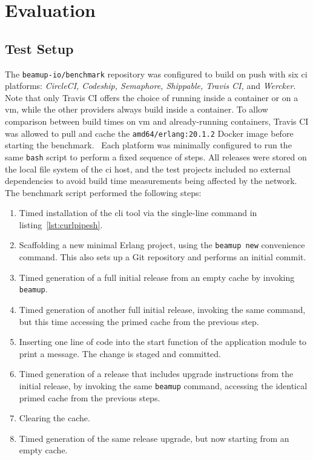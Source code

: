 \cleardoublepage
\section{Evaluation}


\subsection{Test Setup}
The \lstinline|beamup-io/benchmark| repository was configured to build on push with six \acrshort{ci} platforms: \emph{CircleCI, Codeship, Semaphore, Shippable, Travis CI,} and \emph{Wercker}. Note that only Travis CI offers the choice of running inside a container or on a \acrshort{vm}, while the other providers always build inside a container. To allow comparison between build times on \acrshort{vm} and already-running containers, Travis CI was allowed to pull and cache the \lstinline|amd64/erlang:20.1.2| Docker image before starting the benchmark.~\cite{docker:erlang} Each platform was minimally configured to run the same \lstinline|bash| script to perform a fixed sequence of steps. All releases were stored on the local file system of the \acrshort{ci} host, and the test projects included no external dependencies to avoid build time measurements being affected by the network. The benchmark script performed the following steps:

\begin{enumerate}
  \item Timed installation of the \acrshort{cli} tool via the single-line command in listing~\ref{lst:curlpipesh}.
  \item Scaffolding a new minimal Erlang project, using the \lstinline|beamup new| convenience command. This also sets up a Git repository and performs an initial commit.
  \item Timed generation of a full initial release from an empty cache by invoking \lstinline|beamup|.
  \item Timed generation of another full initial release, invoking the same command, but this time accessing the primed cache from the previous step.
  \item Inserting one line of code into the start function of the application module to print a message. The change is staged and committed.
  \item Timed generation of a release that includes upgrade instructions from the initial release, by invoking the same \lstinline|beamup| command, accessing the identical primed cache from the previous steps.
  \item Clearing the cache.
  \item Timed generation of the same release upgrade, but now starting from an empty cache.
\end{enumerate}

